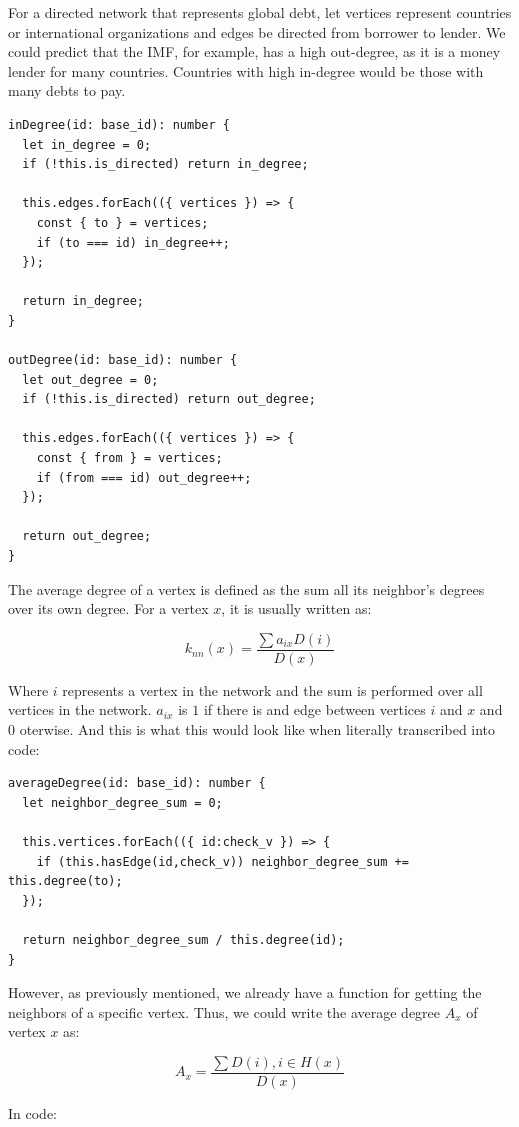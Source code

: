 For a directed network that represents global debt,
let vertices represent countries or international organizations
and edges be directed from borrower to lender.
We could predict that the IMF, for example, has a high out-degree,
as it is a money lender for many countries.
Countries with high in-degree would be those with many debts to pay.

\begin{verbatim}
inDegree(id: base_id): number {
  let in_degree = 0;
  if (!this.is_directed) return in_degree;

  this.edges.forEach(({ vertices }) => {
    const { to } = vertices;
    if (to === id) in_degree++;
  });

  return in_degree;
}

outDegree(id: base_id): number {
  let out_degree = 0;
  if (!this.is_directed) return out_degree;

  this.edges.forEach(({ vertices }) => {
    const { from } = vertices;
    if (from === id) out_degree++;
  });

  return out_degree;
}
\end{verbatim}

The average degree of a vertex is defined as the sum all its neighbor's degrees over its own degree.
For a vertex $x$, it is usually written as:

$$k_{nn}(x)=\frac{\sum{a_{ix}D(i)}}{D(x)}$$

Where $i$ represents a vertex in the network
and the sum is performed over all vertices in the network.
$a_{ix}$ is $1$ if there is and edge between vertices $i$ and $x$ and $0$ oterwise.
And this is what this would look like when literally transcribed into code:

\begin{verbatim}
averageDegree(id: base_id): number {
  let neighbor_degree_sum = 0;

  this.vertices.forEach(({ id:check_v }) => {
    if (this.hasEdge(id,check_v)) neighbor_degree_sum += this.degree(to);
  });

  return neighbor_degree_sum / this.degree(id);
}
\end{verbatim}

However, as previously mentioned, we already have a function for getting the neighbors of
a specific vertex.
Thus, we could write the average degree $A_x$ of vertex $x$ as:

$$A_x=\frac{\sum{D(i)}, i\in H(x)}{D(x)}$$

In code:


